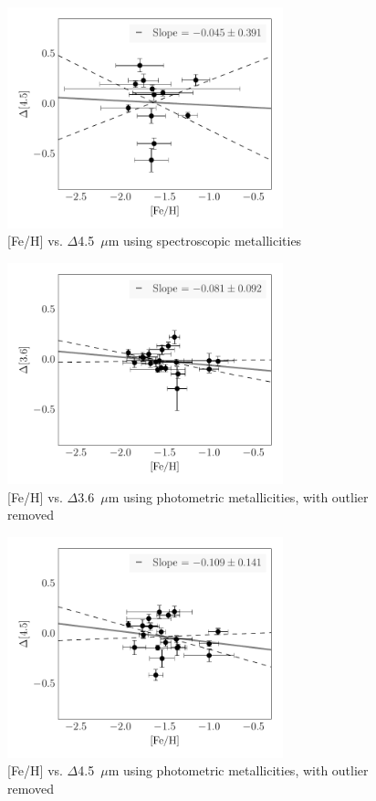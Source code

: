 \documentclass[a4paper,fleqn,usenatbib]{mnras}
\begin{document}
\begin{figure}
\begin{center}
\includegraphics[width=80mm]{final_plots/delta_feh_4p5_spect.pdf}
\caption{[Fe/H] vs. $\Delta$4.5~$\mu$m using spectroscopic metallicities}
\label{fig:delta_4p5_spect}
\end{center}
\end{figure}

\begin{figure}
\begin{center}
\includegraphics[width=80mm]{final_plots/delta_feh_3p6_phot_no_outlier.pdf}
\caption{[Fe/H] vs. $\Delta$3.6~$\mu$m using photometric metallicities, with outlier removed}
\label{fig:delta_3p6_phot_nooutlier}
\end{center}
\end{figure}

\begin{figure}
\begin{center}
\includegraphics[width=80mm]{final_plots/delta_feh_4p5_phot_no_outlier.pdf}
\caption{[Fe/H] vs. $\Delta$4.5~$\mu$m using photometric metallicities, with outlier removed}
\label{fig:delta_4p5_phot_nooutlier}
\end{center}
\end{figure}
\end{document}

